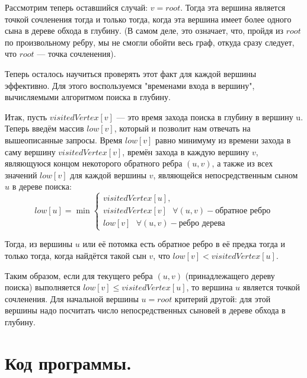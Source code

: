 \documentclass[12pt,a4paper]{scrartcl}
\begin{document}
Рассмотрим теперь оставшийся случай: $v = root$. Тогда эта вершина является точкой сочленения тогда и только тогда, когда эта вершина имеет более одного сына в дереве обхода в глубину. (В самом деле, это означает, что, пройдя из $root$ по произвольному ребру, мы не смогли обойти весь граф, откуда сразу следует, что $root$ — точка сочленения).

Теперь осталось научиться проверять этот факт для каждой вершины эффективно. Для этого воспользуемся "временами входа в вершину", вычисляемыми алгоритмом поиска в глубину.

Итак, пусть $visitedVertex[v]$ — это время захода поиска в глубину в вершину u. Теперь введём массив $low[v]$, который и позволит нам отвечать на вышеописанные запросы. Время $low[v]$ равно минимуму из времени захода в саму вершину $visitedVertex[v]$, времён захода в каждую вершину $v$, являющуюся концом некоторого обратного ребра $(u,v)$, а также из всех значений $low[v]$ для каждой вершины $v$, являющейся непосредственным сыном $u$ в дереве поиска:
\[
 low[u] = \min \begin{cases}
                    visitedVertex[u],\\
                    visitedVertex[v]\text{  } \forall (u,v) - \text{обратное ребро}\\
                    low[v]\text{  }  \forall (u,v) - \text{ребро дерева}
                    \end{cases}
\]

Тогда, из вершины $u$ или её потомка есть обратное ребро в её предка тогда и только тогда, когда найдётся такой сын $v$, что $low[v] < visitedVertex[u]$.

Таким образом, если для текущего ребра $(u,v)$ (принадлежащего дереву поиска) выполняется $low[v] \le visitedVertex[u]$, то вершина $u$ является точкой сочленения. Для начальной вершины $u = root$ критерий другой: для этой вершины надо посчитать число непосредственных сыновей в дереве обхода в глубину.
\section{Код программы.}
\end{document}
